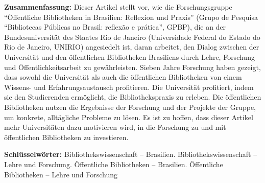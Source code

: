 \textbf{Zusammenfassung:} Dieser Artikel stellt vor, wie die
Forschungsgruppe ``Öffentliche Bibliotheken in Brasilien: Reflexion und
Praxis'' (Grupo de Pesquisa ``Bibliotecas Públicas no Brasil: reflexão e
prática'', GPBP), die an der Bundesuniversität des Staates Rio de
Janeiro (Universidade Federal do Estado do Rio de Janeiro, UNIRIO)
angesiedelt ist, daran arbeitet, den Dialog zwischen der Universität und
den öffentlichen Bibliotheken Brasiliens durch Lehre, Forschung und
Öffentlichkeitsarbeit zu gewährleisten. Sieben Jahre Forschung haben
gezeigt, dass sowohl die Universität als auch die öffentlichen
Bibliotheken von einem Wissens- und Erfahrungsaustausch profitieren. Die
Universität profitiert, indem sie den Studierenden ermöglicht, die
Bibliothekspraxis zu erleben. Die öffentlichen Bibliotheken nutzen die
Ergebnisse der Forschung und der Projekte der Gruppe, um konkrete,
alltägliche Probleme zu lösen. Es ist zu hoffen, dass dieser Artikel
mehr Universitäten dazu motivieren wird, in die Forschung zu und mit
öffentlichen Bibliotheken zu investieren.

\textbf{Schlüsselwörter:} Bibliothekswissenschaft -- Brasilien.
Bibliothekswissenschaft -- Lehre und Forschung. Öffentliche Bibliotheken
-- Brasilien. Öffentliche Bibliotheken -- Lehre und Forschung
